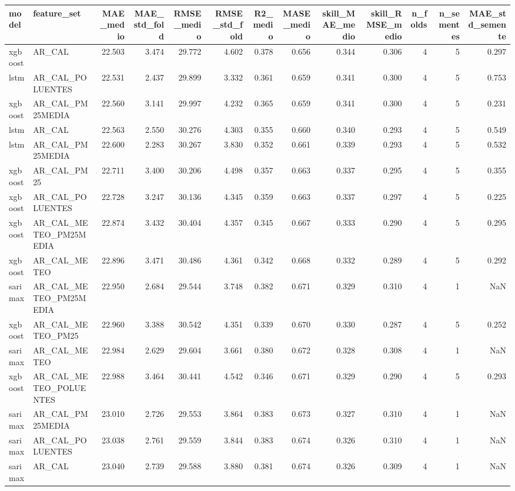 \begin{tabular}{llrrrrrrrrrrr}
\toprule
model & feature_set & MAE_medio & MAE_std_fold & RMSE_medio & RMSE_std_fold & R2_medio & MASE_medio & skill_MAE_medio & skill_RMSE_medio & n_folds & n_sementes & MAE_std_semente \\
\midrule
xgboost & AR_CAL & 22.503 & 3.474 & 29.772 & 4.602 & 0.378 & 0.656 & 0.344 & 0.306 & 4 & 5 & 0.297 \\
lstm & AR_CAL_POLUENTES & 22.531 & 2.437 & 29.899 & 3.332 & 0.361 & 0.659 & 0.341 & 0.300 & 4 & 5 & 0.753 \\
xgboost & AR_CAL_PM25MEDIA & 22.560 & 3.141 & 29.997 & 4.232 & 0.365 & 0.659 & 0.341 & 0.300 & 4 & 5 & 0.231 \\
lstm & AR_CAL & 22.563 & 2.550 & 30.276 & 4.303 & 0.355 & 0.660 & 0.340 & 0.293 & 4 & 5 & 0.549 \\
lstm & AR_CAL_PM25MEDIA & 22.600 & 2.283 & 30.267 & 3.830 & 0.352 & 0.661 & 0.339 & 0.293 & 4 & 5 & 0.532 \\
xgboost & AR_CAL_PM25 & 22.711 & 3.400 & 30.206 & 4.498 & 0.357 & 0.663 & 0.337 & 0.295 & 4 & 5 & 0.355 \\
xgboost & AR_CAL_POLUENTES & 22.728 & 3.247 & 30.136 & 4.345 & 0.359 & 0.663 & 0.337 & 0.297 & 4 & 5 & 0.225 \\
xgboost & AR_CAL_METEO_PM25MEDIA & 22.874 & 3.432 & 30.404 & 4.357 & 0.345 & 0.667 & 0.333 & 0.290 & 4 & 5 & 0.295 \\
xgboost & AR_CAL_METEO & 22.896 & 3.471 & 30.486 & 4.361 & 0.342 & 0.668 & 0.332 & 0.289 & 4 & 5 & 0.292 \\
sarimax & AR_CAL_METEO_PM25MEDIA & 22.950 & 2.684 & 29.544 & 3.748 & 0.382 & 0.671 & 0.329 & 0.310 & 4 & 1 & NaN \\
xgboost & AR_CAL_METEO_PM25 & 22.960 & 3.388 & 30.542 & 4.351 & 0.339 & 0.670 & 0.330 & 0.287 & 4 & 5 & 0.252 \\
sarimax & AR_CAL_METEO & 22.984 & 2.629 & 29.604 & 3.661 & 0.380 & 0.672 & 0.328 & 0.308 & 4 & 1 & NaN \\
xgboost & AR_CAL_METEO_POLUENTES & 22.988 & 3.464 & 30.441 & 4.542 & 0.346 & 0.671 & 0.329 & 0.290 & 4 & 5 & 0.293 \\
sarimax & AR_CAL_PM25MEDIA & 23.010 & 2.726 & 29.553 & 3.864 & 0.383 & 0.673 & 0.327 & 0.310 & 4 & 1 & NaN \\
sarimax & AR_CAL_POLUENTES & 23.038 & 2.761 & 29.559 & 3.844 & 0.383 & 0.674 & 0.326 & 0.310 & 4 & 1 & NaN \\
sarimax & AR_CAL & 23.040 & 2.739 & 29.588 & 3.880 & 0.381 & 0.674 & 0.326 & 0.309 & 4 & 1 & NaN \\

\end{tabular}
